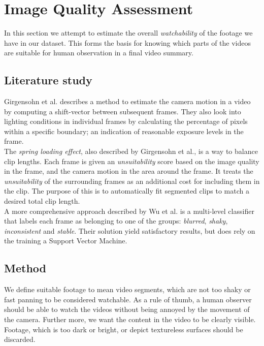 %
\chapter{Image Quality Assessment}
%
In this section we attempt to estimate the overall \textit{watchability} of the footage we have in our dataset. This forms the basis for knowing which parts of the videos are suitable for human observation in a final video summary.
%
\section{Literature study}
%
Girgensohn et al.\cite{Girgensohn:2000:SAH:354401.354415} describes a method to estimate the camera motion in a video by computing a shift-vector between subsequent frames. They also look into lighting conditions in individual frames by calculating the percentage of pixels within a specific boundary; an indication of reasonable exposure levels in the frame.\\
The \textit{spring loading effect}\cite{Girgensohn:2000:SAH:354401.354415}, also described by Girgensohn et al., is a way to balance clip lengths. Each frame is given an \textit{unsuitability} score based on the image quality in the frame, and the camera motion in the area around the frame. It treats the \textit{unsuitability} of the surrounding frames as an additional cost for including them in the clip. The purpose of this is to automatically fit segmented clips to match a desired total clip length.\\
A more comprehensive approach described by Wu et al.\cite{10.1109/ICME.2005.1521399} is a multi-level classifier that labels each frame as belonging to one of the groups: \textit{blurred}, \textit{shaky}, \textit{inconsistent} and \textit{stable}. Their solution yield satisfactory results, but does rely on the training a Support Vector Machine.
%
\section{Method}
%
We define suitable footage to mean video segments, which are not too shaky or fast panning to be considered watchable. As a rule of thumb, a human observer should be able to watch the videos without being annoyed by the movement of the camera. Further more, we want the content in the video to be clearly visible. Footage, which is too dark or bright, or depict textureless surfaces should be discarded.
%
